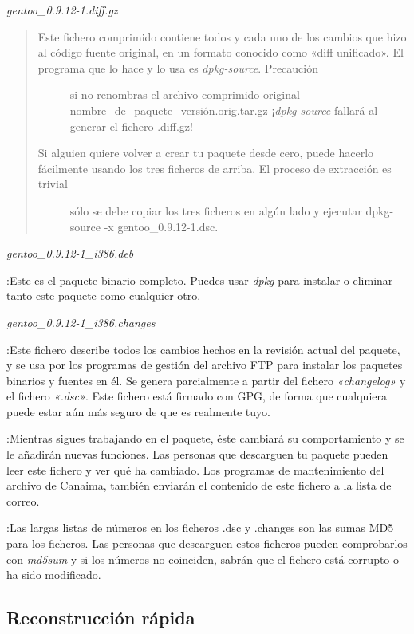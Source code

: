 \documentclass[letterpaper,12pt,spanish]{manual}
\begin{document}
\emph{gentoo\_0.9.12-1.diff.gz}
\begin{quote}\begin{description}
\item[{Este fichero comprimido contiene todos y cada uno de los cambios que hizo al código fuente original, en un formato conocido como «diff unificado». El programa que lo hace y lo usa es \emph{dpkg-source}. Precaución}] \leavevmode
si no renombras el archivo comprimido original nombre\_de\_paquete\_versión.orig.tar.gz ¡\emph{dpkg-source} fallará al generar el fichero .diff.gz!

\item[{Si alguien quiere volver a crear tu paquete desde cero, puede hacerlo fácilmente usando los tres ficheros de arriba. El proceso de extracción es trivial}] \leavevmode
sólo se debe copiar los tres ficheros en algún lado y ejecutar dpkg-source -x gentoo\_0.9.12-1.dsc.

\end{description}\end{quote}

\emph{gentoo\_0.9.12-1\_i386.deb}

:Este es el paquete binario completo. Puedes usar \emph{dpkg} para instalar o eliminar tanto este paquete como cualquier otro.

\emph{gentoo\_0.9.12-1\_i386.changes}

:Este fichero describe todos los cambios hechos en la revisión actual del paquete, y se usa por los programas de gestión del archivo FTP para instalar los paquetes binarios y fuentes en él. Se genera parcialmente a partir del fichero \emph{«changelog»} y el fichero \emph{«.dsc»}. Este fichero está firmado con GPG, de forma que cualquiera puede estar aún más seguro de que es realmente tuyo.

:Mientras sigues trabajando en el paquete, éste cambiará su comportamiento y se le añadirán nuevas funciones. Las personas que descarguen tu paquete pueden leer este fichero y ver qué ha cambiado. Los programas de mantenimiento del archivo de Canaima, también enviarán el contenido de este fichero a la lista de correo.

:Las largas listas de números en los ficheros .dsc y .changes son las sumas MD5 para los ficheros. Las personas que descarguen estos ficheros pueden comprobarlos con \emph{md5sum} y si los números no coinciden, sabrán que el fichero está corrupto o ha sido modificado.


\subsection{Reconstrucción rápida}
\end{document}
